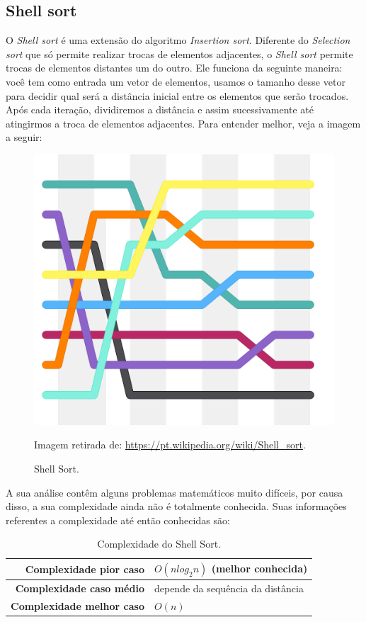 \subsection{Shell sort}
O \textit{Shell sort} é uma extensão do algoritmo \textit{Insertion sort}. Diferente do \textit{Selection sort} que só permite realizar trocas de elementos adjacentes, o \textit{Shell sort} permite trocas de elementos distantes um do outro. Ele funciona da seguinte maneira: você tem como entrada um vetor de elementos, usamos o tamanho desse vetor para decidir qual será a distância inicial entre os elementos que serão trocados. Após cada iteração, dividiremos a distância e assim sucessivamente até atingirmos a troca de elementos adjacentes. Para entender melhor, veja a imagem a seguir:

\begin{figure}[H]
	\centering
	\includegraphics[scale=0.4]{img/shell-sort.png}
	\caption{Shell Sort.}
	\small{Imagem retirada de: \url{https://pt.wikipedia.org/wiki/Shell_sort}.}
	\label{shell-sort}
\end{figure}

A sua análise contêm alguns problemas matemáticos muito difíceis, por causa disso, a sua complexidade ainda não é totalmente conhecida. Suas informações referentes a complexidade até então conhecidas são:

\begin{table}[H]
 \centering
	\begin{tabular}{| r | l |}
		\hline
		\textbf{Complexidade pior caso}   & $O(nlog_{2}n)$ (melhor conhecida) \\
		\hline
		\textbf{Complexidade caso médio}  & depende da sequência da distância \\
		\hline
		\textbf{Complexidade melhor caso} & $O(n)$ \\
		\hline
	\end{tabular}
	\caption{Complexidade do Shell Sort.}
	\label{t_shell_sort}
\end{table}

